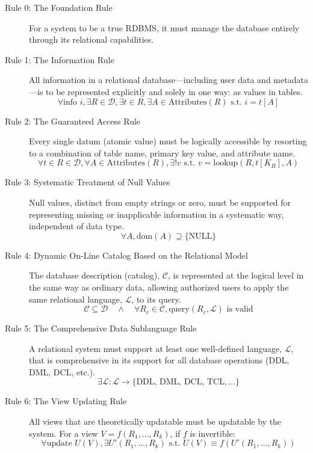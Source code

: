 \begin{description}
    \item[Rule 0: The Foundation Rule] For a system to be a true RDBMS, it must manage the database entirely through its relational capabilities.
    
    \item[Rule 1: The Information Rule] All information in a relational database—including user data and metadata—is to be represented explicitly and solely in one way: as values in tables.
    \[ \forall \text{info } i, \exists R \in \mathcal{D}, \exists t \in R, \exists A \in \text{Attributes}(R) \text{ s.t. } i = t[A] \]

    \item[Rule 2: The Guaranteed Access Rule] Every single datum (atomic value) must be logically accessible by resorting to a combination of table name, primary key value, and attribute name.
    \[ \forall t \in R \in \mathcal{D}, \forall A \in \text{Attributes}(R), \exists! v \text{ s.t. } v = \text{lookup}(R, t[K_R], A) \]

    \item[Rule 3: Systematic Treatment of Null Values] Null values, distinct from empty strings or zero, must be supported for representing missing or inapplicable information in a systematic way, independent of data type.
    \[ \forall A, \text{dom}(A) \supseteq \{\text{NULL}\} \]

    \item[Rule 4: Dynamic On-Line Catalog Based on the Relational Model] The database description (catalog), $\mathcal{C}$, is represented at the logical level in the same way as ordinary data, allowing authorized users to apply the same relational language, $\mathcal{L}$, to its query.
    \[ \mathcal{C} \subseteq \mathcal{D} \quad \land \quad \forall R_c \in \mathcal{C}, \text{query}(R_c, \mathcal{L}) \text{ is valid} \]

    \item[Rule 5: The Comprehensive Data Sublanguage Rule] A relational system must support at least one well-defined language, $\mathcal{L}$, that is comprehensive in its support for all database operations (DDL, DML, DCL, etc.).
    \[ \exists \mathcal{L} : \mathcal{L} \to \{\text{DDL, DML, DCL, TCL}, ...\} \]

    \item[Rule 6: The View Updating Rule] All views that are theoretically updatable must be updatable by the system. For a view $V = f(R_1, ..., R_k)$, if $f$ is invertible:
    \[ \forall \text{update } U(V), \exists U'(R_1,...,R_k) \text{ s.t. } U(V) \equiv f(U'(R_1,...,R_k)) \]


\end{description}
